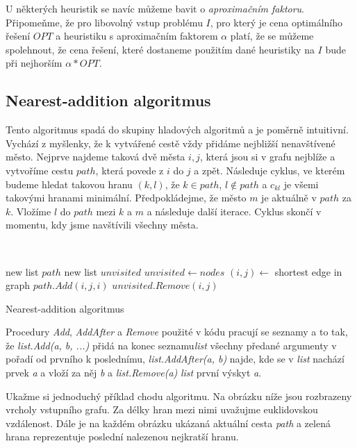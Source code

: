\documentclass[
  printversion=false,
  joinlists=true,
  glossaries=true,
  figures=true,
  tables=true,
  sourcecodes=false,
  theorems=false,
  bibencoding=utf8,
  language=czech,
  encoding=utf8,
  program=infpvs,
  index=true,
  biblatex=true
]{kidiplom}
\begin{document}
U některých heuristik se navíc můžeme bavit o \textit{aproximačním faktoru}. Připomeňme, že pro libovolný vstup problému $I$, pro který je cena optimálního řešení $OPT$ a heuristiku s aproximačním faktorem $\alpha$ platí, že se můžeme spolehnout, že cena řešení, které dostaneme použitím dané heuristiky na $I$ bude při nejhorším $\alpha * OPT$.

\subsection{Nearest-addition algoritmus}
	Tento algoritmus spadá do skupiny hladových algoritmů a je poměrně intuitivní. Vychází z myšlenky, že k vytvářené cestě vždy přidáme nejbližší nenavštívené město. Nejprve najdeme taková dvě města $i, j$, která jsou si v grafu nejblíže a vytvoříme cestu $path$, která povede z $i$ do $j$ a zpět. Následuje cyklus, ve kterém budeme hledat takovou hranu $(k, l)$, že $k \in path$, $l \notin path$ a $c_{kl}$ je všemi takovými hranami minimální. Předpokládejme, že město $m$ je aktuálně v $path$ za $k$. Vložíme $l$ do $path$ mezi $k$ a $m$ a následuje další iterace. Cyklus skončí v momentu, kdy jsme navštívili všechny města.\newline
	
{\SetAlgoNoLine\
\begin{algorithm}[H]
new list $path$\;
new list $unvisited$\;
$unvisited \leftarrow nodes$\;
$(i, j) \leftarrow $ shortest edge in graph\;
$path.Add(i, j, i)$\;
$unvisited.Remove(i, j)$\;

\caption{Nearest-addition algoritmus}
\end{algorithm}}\leavevmode\newline

Procedury \textit{Add}, \textit{AddAfter} a \textit{Remove} použité v kódu pracují se seznamy a to tak, že \textit{list.Add(a, b, ...)} přidá na konec seznamu\textit{list} všechny předané argumenty v pořadí od prvního k poslednímu, \textit{list.AddAfter(a, b)} najde, kde se v \textit{list} nachází prvek \textit{a} a vloží za něj \textit{b} a \textit{list.Remove(a)} \textit{list} první výskyt \textit{a}.

Ukažme si jednoduchý příklad chodu algoritmu. Na obrázku níže jsou rozbrazeny vrcholy vstupního grafu. Za délky hran mezi nimi uvažujme euklidovskou vzdálenost. Dále je na každém obrázku ukázaná aktuální cesta \textit{path} a zelená hrana reprezentuje poslední nalezenou nejkratší hranu.
\end{document}
